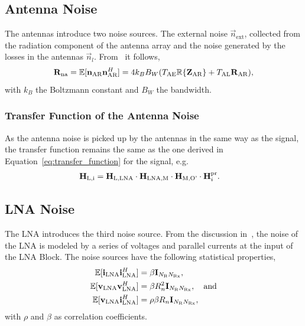 \subsection{Antenna Noise}
\label{sec:antenna_noise}

The antennas introduce two noise sources.
The external noise $\vec{n}_\text{ext}$, collected from the radiation component of the antenna array and the noise generated by the losses in the antennas $\vec{n}_l$.
From~\cite{Twiss1955} it follows, 
\begin{equation}
\label{eq:cov_ant}
\mathbf{R}_\text{na} = \mathbb{E}[\mathbf{n}_\text{AR}\mathbf{n}_\text{AR}^H] = 4 k_B B_W(T_\text{AE}\mathbb{R}\{\mathbf{Z}_\text{AR}\}+T_\text{AL}\mathbf{R}_\text{AR}),
\end{equation}
with $k_B$ the Boltzmann constant and $B_W$ the bandwidth.

\subsubsection{Transfer Function of the Antenna Noise}
\label{sec:antenna_noise_transf}
As the antenna noise is picked up by the antennas in the same way as the signal, the transfer function remains the same as the one derived in Equation~\eqref{eq:transfer_function} for the signal, e.g.
\begin{align}
\mathbf{H}_\text{L,i} &= \mathbf{H}_\text{L,LNA}\cdot\mathbf{H}_\text{LNA,M}\cdot\mathbf{H}_\text{M,O'} \cdot \mathbf{H}_i^{\text{pr}}.
\end{align}

\subsection{LNA Noise}
\label{sec:lna_noise}

The LNA introduces the third noise source.
From the discussion in~\cite{Nossek}, the noise of the LNA is modeled by a series of voltages and parallel currents at the input of the LNA Block.
The noise sources have the following statistical properties,
\begin{align}
\label{eq:cov_lna}
\mathbb{E}[\mathbf{i}_\text{LNA}\mathbf{i}_\text{LNA}^H] &= \beta \mathbf{I}_{N_\text{R}N_\text{Rx}},\\\nonumber
\mathbb{E}[\mathbf{v}_\text{LNA}\mathbf{v}_\text{LNA}^H] &= \beta R_n^2\mathbf{I}_{N_\text{R}N_\text{Rx}},\quad\text{and}\\\nonumber
\mathbb{E}[\mathbf{v}_\text{LNA}\mathbf{i}_\text{LNA}^H] &= \rho \beta R_n\mathbf{I}_{N_\text{R}N_\text{Rx}},
\end{align}
with $\rho$ and $\beta$ as correlation coefficients.

